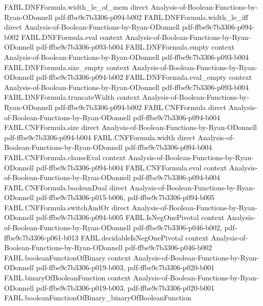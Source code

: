 \begin{theorem}
\proofstep
  {FABL.DNFFormula.width_le_of_mem}
  {direct}
  {Analysis-of-Boolean-Functions-by-Ryan-ODonnell}
  {pdf-ffbe9c7b3306-p094-b002}
\proofstep
  {FABL.DNFFormula.width_le_iff}
  {direct}
  {Analysis-of-Boolean-Functions-by-Ryan-ODonnell}
  {pdf-ffbe9c7b3306-p094-b002}
\proofstep
  {FABL.DNFFormula.eval}
  {context}
  {Analysis-of-Boolean-Functions-by-Ryan-ODonnell}
  {pdf-ffbe9c7b3306-p093-b004}
\proofstep
  {FABL.DNFFormula.empty}
  {context}
  {Analysis-of-Boolean-Functions-by-Ryan-ODonnell}
  {pdf-ffbe9c7b3306-p093-b004}
\proofstep
  {FABL.DNFFormula.size_empty}
  {context}
  {Analysis-of-Boolean-Functions-by-Ryan-ODonnell}
  {pdf-ffbe9c7b3306-p094-b002}
\proofstep
  {FABL.DNFFormula.eval_empty}
  {context}
  {Analysis-of-Boolean-Functions-by-Ryan-ODonnell}
  {pdf-ffbe9c7b3306-p093-b004}
\proofstep
  {FABL.DNFFormula.truncateWidth}
  {context}
  {Analysis-of-Boolean-Functions-by-Ryan-ODonnell}
  {pdf-ffbe9c7b3306-p094-b002}
\proofstep
  {FABL.CNFFormula}
  {direct}
  {Analysis-of-Boolean-Functions-by-Ryan-ODonnell}
  {pdf-ffbe9c7b3306-p094-b004}
\proofstep
  {FABL.CNFFormula.size}
  {direct}
  {Analysis-of-Boolean-Functions-by-Ryan-ODonnell}
  {pdf-ffbe9c7b3306-p094-b004}
\proofstep
  {FABL.CNFFormula.width}
  {direct}
  {Analysis-of-Boolean-Functions-by-Ryan-ODonnell}
  {pdf-ffbe9c7b3306-p094-b004}
\proofstep
  {FABL.CNFFormula.clauseEval}
  {context}
  {Analysis-of-Boolean-Functions-by-Ryan-ODonnell}
  {pdf-ffbe9c7b3306-p094-b004}
\proofstep
  {FABL.CNFFormula.eval}
  {context}
  {Analysis-of-Boolean-Functions-by-Ryan-ODonnell}
  {pdf-ffbe9c7b3306-p094-b004}
\proofstep
  {FABL.CNFFormula.booleanDual}
  {direct}
  {Analysis-of-Boolean-Functions-by-Ryan-ODonnell}
  {pdf-ffbe9c7b3306-p015-b006,
    pdf-ffbe9c7b3306-p094-b005}
\proofstep
  {FABL.CNFFormula.switchAndOr}
  {direct}
  {Analysis-of-Boolean-Functions-by-Ryan-ODonnell}
  {pdf-ffbe9c7b3306-p094-b005}
\proofstep
  {FABL.IsNegOnePivotal}
  {context}
  {Analysis-of-Boolean-Functions-by-Ryan-ODonnell}
  {pdf-ffbe9c7b3306-p046-b002,
    pdf-ffbe9c7b3306-p061-b013}
\proofstep
  {FABL.decidableIsNegOnePivotal}
  {context}
  {Analysis-of-Boolean-Functions-by-Ryan-ODonnell}
  {pdf-ffbe9c7b3306-p046-b002}
\proofstep
  {FABL.booleanFunctionOfBinary}
  {context}
  {Analysis-of-Boolean-Functions-by-Ryan-ODonnell}
  {pdf-ffbe9c7b3306-p019-b003,
    pdf-ffbe9c7b3306-p020-b001}
\proofstep
  {FABL.binaryOfBooleanFunction}
  {context}
  {Analysis-of-Boolean-Functions-by-Ryan-ODonnell}
  {pdf-ffbe9c7b3306-p019-b003,
    pdf-ffbe9c7b3306-p020-b001}
\proofstep
  {FABL.booleanFunctionOfBinary_binaryOfBooleanFunction}

\end{theorem}
